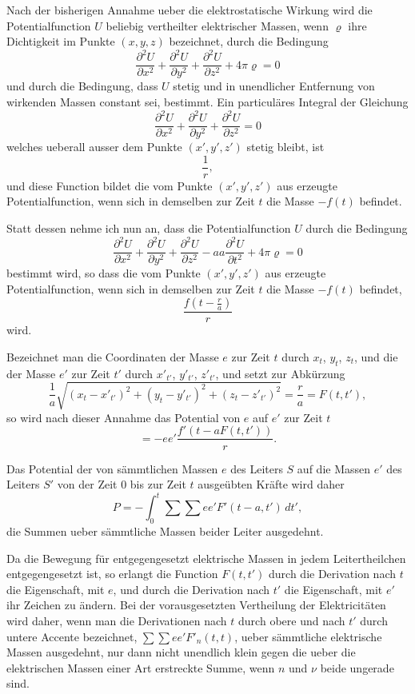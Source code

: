 \documentclass[12pt,a4paper]{article}
\begin{document}
Nach der bisherigen Annahme ueber die elektrostatische Wirkung wird die Potentialfunction $U$ beliebig vertheilter elektrischer Massen, wenn $\varrho$ ihre Dichtigkeit im Punkte $(x,y,z)$ bezeichnet, durch die Bedingung
\[\frac{\partial^{2}U}{\partial x^{2}} + \frac{\partial^{2}U}{\partial y^{2}} + \frac{\partial^{2}U}{\partial z^{2}} + 4\pi\varrho = 0\]
und durch die Bedingung, dass $U$ stetig und in unendlicher Entfernung von wirkenden Massen constant sei, bestimmt. Ein particul\"ares Integral der Gleichung
\[\frac{\partial^{2}U}{\partial x^{2}} + \frac{\partial^{2}U}{\partial y^{2}} + \frac{\partial^{2}U}{\partial z^{2}} = 0\]
welches ueberall ausser dem Punkte $(x',y',z')$ stetig bleibt, ist
\[\frac{1}{r},\]
und diese Function bildet die vom Punkte $(x',y',z')$ aus erzeugte Potentialfunction, wenn sich in demselben zur Zeit $t$ die Masse $-f(t)$ befindet.

Statt dessen nehme ich nun an, dass die Potentialfunction $U$ durch die Bedingung
\[\frac{\partial^{2}U}{\partial x^{2}} + \frac{\partial^{2}U}{\partial y^{2}} + \frac{\partial^{2}U}{\partial z^{2}} - aa \frac{\partial^{2}U}{\partial t^{2}} + 4\pi\varrho = 0\]
bestimmt wird, so dass die vom Punkte $(x',y',z')$ aus erzeugte Potentialfunction, wenn sich in demselben zur Zeit $t$ die Masse $-f(t)$ befindet,
\[\frac{f\left(t - \frac{r}{a}\right)}{r}\]
wird.

Bezeichnet man die Coordinaten der Masse $e$ zur Zeit $t$ durch $x_{t}$, $y_{t}$, $z_{t}$, und die der Masse $e'$ zur Zeit $t'$ durch $x'_{t'}$, $y'_{t'}$, $z'_{t'}$, und setzt zur Abk\"urzung
\[\frac{1}{a}\sqrt{(x_{t} - x'_{t'})^{2} + (y_{t} - y'_{t'})^{2} + (z_{t} - z'_{t'})^{2}} = \frac{r}{a} = F(t,t'),\]
so wird nach dieser Annahme das Potential von $e$ auf $e'$ zur Zeit $t$
\[= -ee' \frac{f'(t - aF(t,t'))}{r}.\]

\newpage
Das Potential der von s\"ammtlichen Massen $e$ des Leiters $S$ auf die Massen $e'$ des Leiters $S'$ von der Zeit $0$ bis zur Zeit $t$ ausge\"ubten Kr\"afte wird daher
\[P = - \int_{0}^{t} \sum\sum ee' F'(t-a, t')\, dt',\]
die Summen ueber s\"ammtliche Massen beider Leiter ausgedehnt.

Da die Bewegung f\"ur entgegengesetzt elektrische Massen in jedem Leitertheilchen entgegengesetzt ist, so erlangt die Function $F(t,t')$ durch die Derivation nach $t$ die Eigenschaft, mit $e$, und durch die Derivation nach $t'$ die Eigenschaft, mit $e'$ ihr Zeichen zu \"andern. Bei der vorausgesetzten Vertheilung der Elektricit\"aten wird daher, wenn man die Derivationen nach $t$ durch obere und nach $t'$ durch untere Accente bezeichnet, $\sum\sum ee' F'_{n}(t,t)$, ueber s\"ammtliche elektrische Massen ausgedehnt, nur dann nicht unendlich klein gegen die ueber die elektrischen Massen einer Art erstreckte Summe, wenn $n$ und $\nu$ beide ungerade sind.
\end{document}

